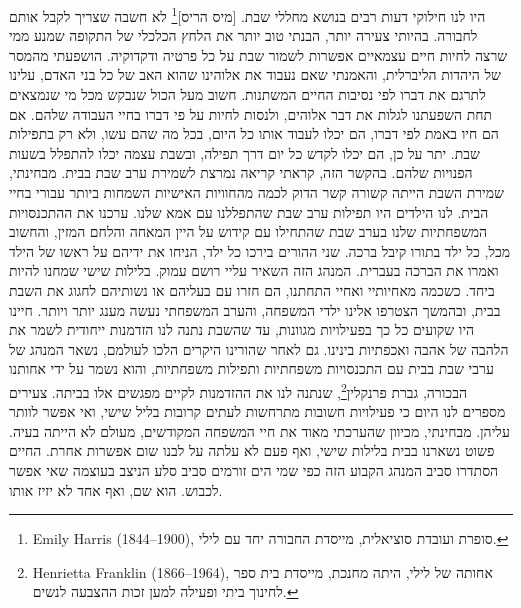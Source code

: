 \documentclass[14pt, article, extrafontsizes, twopage, a4paper]{memoir}
\begin{document}
היו לנו חילוקי דעות רבים בנושא מחללי שבת. [מיס הריס]\footnote{\textenglish{Emily Harris (1844–1900)}, סופרת ועובדת סוציאלית, מייסדת החבורה יחד עם לילי.} לא חשבה שצריך לקבל אותם לחבורה. בהיותי צעירה יותר, הבנתי טוב יותר את הלחץ הכלכלי של התקופה שמנע ממי שרצה לחיות חיים עצמאיים אפשרות לשמור שבת על כל פרטיה ודקדוקיה. הושפעתי מהמסר של היהדות הליברלית, והאמנתי שאם נעבוד את אלוהינו שהוא האב של כל בני האדם, עלינו לתרגם את דברו לפי נסיבות החיים המשתנות. חשוב מעל הכול שנבקש מכל מי שנמצאים תחת השפעתנו לגלות את דבר אלוהים, ולנסות לחיות על פי דברו בחיי העבודה שלהם. אם הם חיו באמת לפי דברו, הם יכלו לעבוד אותו כל היום, בכל מה שהם עשו, ולא רק בתפילות שבת. יתר על כן, הם יכלו לקדש כל יום דרך תפילה, ובשבת עצמה יכלו להתפלל בשעות הפנויות שלהם. בהקשר הזה, קראתי קריאה נמרצת לשמירת ערב שבת בבית. מבחינתי, שמירת השבת הייתה קשורה קשר הדוק לכמה מהחוויות האישיות השמחות ביותר עבורי בחיי הבית. לנו הילדים היו תפילות ערב שבת שהתפללנו עם אמא שלנו. ערכנו את ההתכנסויות המשפחתיות שלנו בערב שבת שהתחילו עם קידוש על היין המאחה והלחם המזין, והחשוב מכל, כל ילד בתורו קיבל ברכה. שני ההורים בירכו כל ילד, הניחו את ידיהם על ראשו של הילד ואמרו את הברכה בעברית. המנהג הזה השאיר עליי רושם עמוק. בלילות שישי שמחנו להיות ביחד. כשכמה מאחיותיי ואחיי התחתנו, הם חזרו עם בעליהם או נשותיהם לחגוג את השבת בבית, ובהמשך הצטרפו אלינו ילדי המשפחה, והערב המשפחתי נעשה מענג יותר ויותר. חיינו היו שקועים כל כך בפעילויות מגוונות, עד שהשבת נתנה לנו הזדמנות ייחודית לשמר את הלהבה של אהבה ואכפתיות בינינו. גם לאחר שהורינו היקרים הלכו לעולמם, נשאר המנהג של ערבי שבת בבית עם התכנסויות משפחתיות ותפילות משפחתיות, והוא נשמר על ידי אחותנו הבכורה, גברת פרנקלין\footnote{\textenglish{Henrietta Franklin} (1866–1964), אחותה של לילי, היתה מחנכת, מייסדת בית ספר לחינוך ביתי ופעילה למען זכות ההצבעה לנשים.}, שנתנה לנו את ההזדמנות לקיים מפגשים אלו בביתה. צעירים מספרים לנו היום כי פעילויות חשובות מתרחשות לעתים קרובות בליל שישי, ואי אפשר לוותר עליהן. מבחינתי, מכיוון שהערכתי מאוד את חיי המשפחה המקודשים, מעולם לא הייתה בעיה. פשוט נשארנו בבית בלילות שישי, ואף פעם לא עלתה על לבנו שום אפשרות אחרת. החיים הסתדרו סביב המנהג הקבוע הזה כפי שמי הים זורמים סביב סלע הניצב בעוצמה שאי אפשר לכבוש. הוא שם, ואף אחד לא יזיז אותו.
\end{document}
